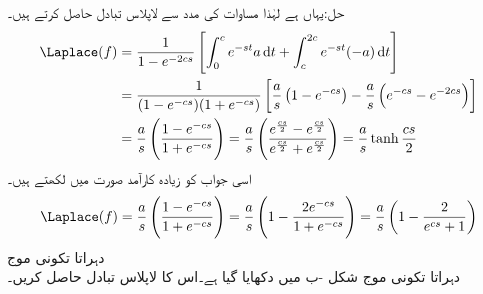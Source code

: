 حل:یہاں  ہے لہٰذا مساوات  کی مدد سے لاپلاس تبادل حاصل کرتے ہیں۔
\begin{align*}
\Laplace(f)&=\frac{1}{1-e^{-2cs}}\left[\int_{0}^{c}e^{-st} a\dif t +\int_{c}^{2c}e^{-st}(-a)\dif t\right]\\
&=\frac{1}{(1-e^{-cs})(1+e^{-cs})}\left[\frac{a}{s}\left(1-e^{-cs}\right)-\frac{a}{s}\left(e^{-cs}-e^{-2cs}\right)\right]\\
&=\frac{a}{s}\left(\frac{1-e^{-cs}}{1+e^{-cs}}\right)=\frac{a}{s}\left(\frac{e^{\frac{cs}{2}}-e^{\frac{cs}{2}}}{e^{\frac{cs}{2}}+e^{\frac{cs}{2}}}\right)=\frac{a}{s}\tanh \frac{cs}{2}
\end{align*}
اسی جواب کو زیادہ کارآمد صورت میں لکھتے ہیں۔
\begin{align*}
\Laplace(f)=\frac{a}{s}\left(\frac{1-e^{-cs}}{1+e^{-cs}}\right)=\frac{a}{s}\left(1-\frac{2e^{-cs}}{1+e^{-cs}}\right)=\frac{a}{s}\left(1-\frac{2}{e^{cs}+1}\right)
\end{align*}
\quad دہراتا تکونی موج\\
دہراتا تکونی موج شکل -ب میں دکھایا گیا ہے۔اس کا لاپلاس تبادل حاصل کریں۔


